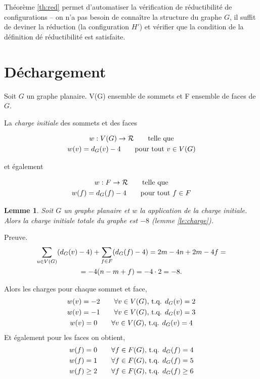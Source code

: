 \documentclass{beamer}
\newtheorem{lemme}{Lemme}
\begin{document}
\begin{frame}
Théorème \ref{th:red} permet d'automatiser la vérification de réductibilité de configurations -- on n'a pas besoin de connaître la structure du graphe $G$, il suffit de deviner la réduction (la configuration $H'$) et vérifier que la condition de la définition dé réductibilité est satisfaite.
\end{frame}

\section{Déchargement}
\begin{frame}
Soit $G$ un graphe planaire. V(G) ensemble de sommets et F ensemble de faces de $G$.

La \emph{charge initiale} des sommets et des faces

$$
\gathered
w: V(G) \to \mathcal{R} \qquad \textrm{telle que}\\
w(v) = d_G(v) - 4 \qquad \textrm{pour tout $v \in V(G)$}\\
\endgathered
$$

et également

$$
\gathered
w: F \to \mathcal{R} \qquad \textrm{telle que}\\
w(f) = d_G(f) - 4 \qquad \textrm{pour tout $f \in F$}\\
\endgathered
$$
\end{frame}

\begin{frame}
\begin{lemme}
Soit $G$ un graphe planaire et $w$ la application de la charge initiale. Alors la charge initiale totale du graphe est $-8$ (lemme \ref{le:charge}).
\end{lemme}

Preuve.
$$
\gathered
\sum_{u \in V(G)} (d_G(v) - 4) + \sum_{f \in F} (d_G(f) - 4) = 2m - 4n + 2m - 4f =\\
= -4( n - m + f) = -4 \cdot 2 = -8.
\endgathered
$$
\end{frame}

\begin{frame}
Alors les charges pour chaque sommet et face,
$$
\gathered
w(v) = -2 \qquad \forall v \in V(G) \textrm{,  t.q.  } d_G(v) = 2\\
w(v) = -1 \qquad \forall v \in V(G) \textrm{,  t.q.  } d_G(v) = 3\\
w(v) = 0 \qquad \forall  v \in V(G) \textrm{,  t.q.  } d_G(v) = 4
\endgathered
$$
Et également pour les faces on obtient,
$$
\gathered
w(f) = 0 \qquad \forall f \in F(G) \textrm{,  t.q.  } d_G(f) = 4\\
w(f) = 1 \qquad \forall f \in F(G) \textrm{,  t.q.  } d_G(f) = 5\\
w(f) \geq 2 \qquad \forall f \in F(G) \textrm{, t.q.  } d_G(f) \geq 6
\endgathered
$$
\end{frame}
\end{document}
